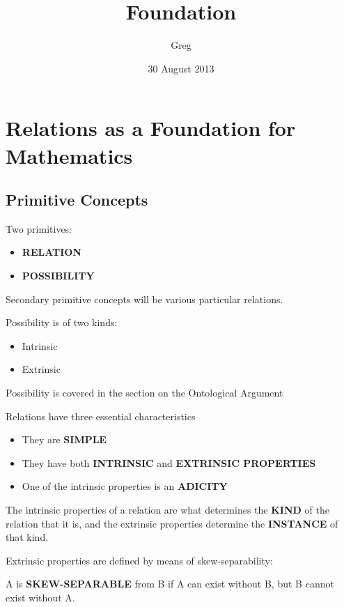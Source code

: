 \documentclass[11pt]{article}
\title{Foundation}
\author{Greg}
\date{30 August 2013}
\begin{document}
\maketitle

\setcounter{tocdepth}{3}
\tableofcontents
\vspace*{1cm}
\section{Relations as a Foundation for Mathematics}
\label{sec-1}

\subsection{Primitive Concepts}
\label{sec-1.1}

Two primitives:
\begin{itemize}
\item \textbf{RELATION}
\item \textbf{POSSIBILITY}
\end{itemize}
Secondary primitive concepts will be various particular relations.

Possibility is of two kinds:
\begin{itemize}
\item Intrinsic
\item Extrinsic
\end{itemize}
Possibility is covered in the section on the Ontological Argument

Relations have three essential characteristics
\begin{itemize}
\item They are \textbf{SIMPLE}
\item They have both \textbf{INTRINSIC} and \textbf{EXTRINSIC PROPERTIES}
\item One of the intrinsic properties is an \textbf{ADICITY}
\end{itemize}
The intrinsic properties of a relation are what determines the
\textbf{KIND} of the relation that it is, and the extrinsic properties
determine the \textbf{INSTANCE} of that kind.

Extrinsic properties are defined by means of skew-separability:

A is \textbf{SKEW-SEPARABLE} from B if A can exist without B,
but B cannot exist without A.
\end{document}
